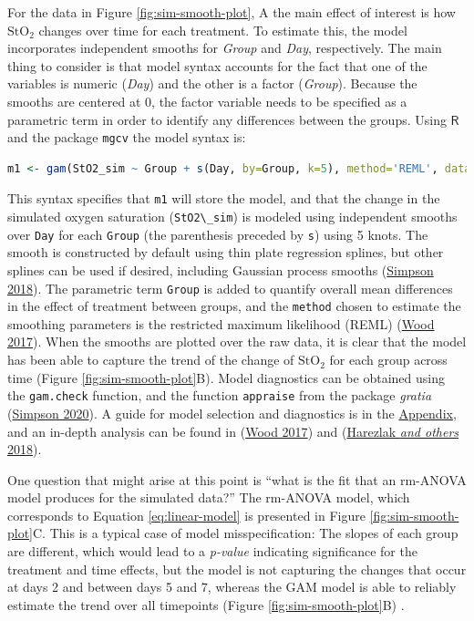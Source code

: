 \documentclass[
]{article}
\newcommand{\passthrough}[1]{#1}
\begin{document}
For the data in Figure \ref{fig:sim-smooth-plot}, A the main effect of interest is how \(\mbox{StO}_2\) changes over time for each treatment. To estimate this, the model incorporates independent smooths for \emph{Group} and \emph{Day}, respectively. The main thing to consider is that model syntax accounts for the fact that one of the variables is numeric (\emph{Day}) and the other is a factor (\emph{Group}). Because the smooths are centered at 0, the factor variable needs to be specified as a parametric term in order to identify any differences between the groups. Using \(\textsf{R}\) and the package \passthrough{\lstinline!mgcv!} the model syntax is:

\begin{lstlisting}[language=R]
m1 <- gam(StO2_sim ~ Group + s(Day, by=Group, k=5), method='REML', data = dat_sim)
\end{lstlisting}

This syntax specifies that \passthrough{\lstinline!m1!} will store the model, and that the change in the simulated oxygen saturation (\passthrough{\lstinline!StO2\_sim!}) is modeled using independent smooths over \passthrough{\lstinline!Day!} for each \passthrough{\lstinline!Group!} (the parenthesis preceded by \passthrough{\lstinline!s!}) using 5 knots. The smooth is constructed by default using thin plate regression splines, but other splines can be used if desired, including Gaussian process smooths (\protect\hyperlink{ref-simpson2018}{Simpson 2018}). The parametric term \passthrough{\lstinline!Group!} is added to quantify overall mean differences in the effect of treatment between groups, and the \passthrough{\lstinline!method!} chosen to estimate the smoothing parameters is the restricted maximum likelihood (REML) (\protect\hyperlink{ref-wood2017}{Wood 2017}). When the smooths are plotted over the raw data, it is clear that the model has been able to capture the trend of the change of \(\mbox{StO}_2\) for each group across time (Figure \ref{fig:sim-smooth-plot}B). Model diagnostics can be obtained using the \passthrough{\lstinline!gam.check!} function, and the function \passthrough{\lstinline!appraise!} from the package \emph{gratia} (\protect\hyperlink{ref-gratia}{Simpson 2020}). A guide for model selection and diagnostics is in the \protect\hyperlink{workflow}{Appendix}, and an in-depth analysis can be found in (\protect\hyperlink{ref-wood2017}{Wood 2017}) and (\protect\hyperlink{ref-harezlak2018}{Harezlak \emph{and others} 2018}).

One question that might arise at this point is ``what is the fit that an rm-ANOVA model produces for the simulated data?'' The rm-ANOVA model, which corresponds to Equation \eqref{eq:linear-model} is presented in Figure \ref{fig:sim-smooth-plot}C. This is a typical case of model misspecification: The slopes of each group are different, which would lead to a \emph{p-value} indicating significance for the treatment and time effects, but the model is not capturing the changes that occur at days 2 and between days 5 and 7, whereas the GAM model is able to reliably estimate the trend over all timepoints (Figure \ref{fig:sim-smooth-plot}B) .
\end{document}
